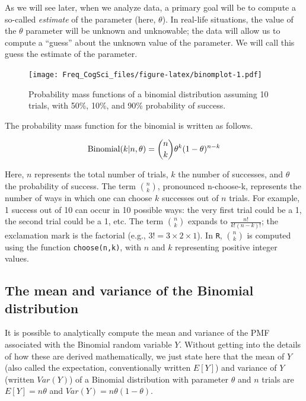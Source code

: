 \documentclass[12pt,]{krantz}
\begin{document}
As we will see later, when we analyze data, a primary goal will be to compute a so-called \emph{estimate} of the parameter (here, \(\theta\)). In real-life situations, the value of the \(\theta\) parameter will be unknown and unknowable; the data will allow us to compute a ``guess'' about the unknown value of the parameter. We will call this guess the estimate of the parameter.

\begin{figure}
\centering
\texttt{[image: Freq\_CogSci\_files/figure-latex/binomplot-1.pdf]}
\caption{\label{fig:binomplot}Probability mass functions of a binomial distribution assuming 10 trials, with 50\%, 10\%, and 90\% probability of success.}
\end{figure}

The probability mass function for the binomial is written as follows.

\begin{equation}
\hbox{Binomial}(k|n,\theta) = 
\binom{n}{k} \theta^{k} (1-\theta)^{n-k}
\end{equation}

Here, \(n\) represents the total number of trials, \(k\) the number of successes, and \(\theta\) the probability of success. The term \(\binom{n}{k}\), pronounced n-choose-k, represents the number of ways in which one can choose \(k\) successes out of \(n\) trials. For example, 1 success out of 10 can occur in 10 possible ways: the very first trial could be a 1, the second trial could be a 1, etc.
The term \(\binom{n}{k}\) expands to \(\frac{n!}{k!(n-k)!}\); the exclamation mark is the factorial (e.g., \(3!=3\times 2\times 1\)). In \texttt{R}, \(\binom{n}{k}\) is computed using the function \texttt{choose(n,k)}, with \(n\) and \(k\) representing positive integer values.

\hypertarget{the-mean-and-variance-of-the-binomial-distribution}{%
\subsection{The mean and variance of the Binomial distribution}\label{the-mean-and-variance-of-the-binomial-distribution}}

It is possible to analytically compute the mean and variance of the PMF associated with the Binomial random variable \(Y\). Without getting into the details of how these are derived mathematically, we just state here that the mean of \(Y\) (also called the expectation, conventionally written \(E[Y]\)) and variance of \(Y\) (written \(Var(Y)\)) of a Binomial distribution with parameter \(\theta\) and \(n\) trials are \(E[Y] = n\theta\) and \(Var(Y) = n\theta (1-\theta)\).
\end{document}
